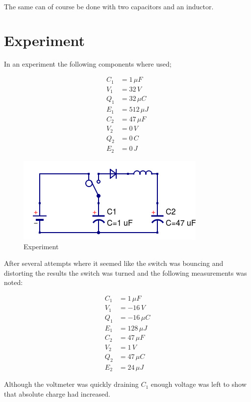 The same can of course be done with two capacitors and an inductor.

\pagebreak

\section{Experiment}

In an experiment the following components where used;

\begin{align}
C_1 &= 1 \, \mu F \\
V_1 &= 32 \, V \\
Q_1 &= 32 \, \mu C \\
E_1 &= 512 \, \mu J \\
C_2 &= 47 \, \mu F \\
V_2 &= 0 \, V \\
Q_2 &= 0 \, C \\
E_2 &= 0 \, J
\end{align}

\begin{figure}[ht] \centering
	\includegraphics[scale=.5]{BLCC} \caption{Experiment}
\end{figure}

After several attempts where it seemed like the switch was bouncing and distorting the results the switch was turned and the following measurements was noted:

\begin{align}
C_1 &= 1 \, \mu F \\
V_1 &= -16 \, V \\
Q_1 &= -16 \, \mu C \\
E_1 &= 128 \, \mu J \\
C_2 &= 47 \, \mu F \\
V_2 &= 1 \, V \\
Q_2 &= 47 \, \mu C \\
E_2 &= 24 \, \mu J
\end{align}

Although the voltmeter was quickly draining $C_1$ enough voltage was left to show that absolute charge had increased.


